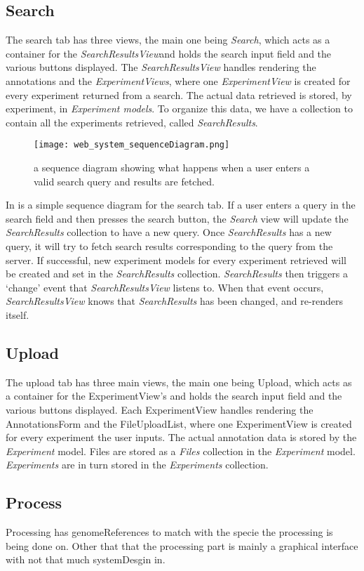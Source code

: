 \subsection{Search}
The search tab has three views, the main one being \textit{Search}, which acts as a container for the \textit{SearchResultsView}and holds the search input field and the various buttons displayed. The \textit{SearchResultsView} handles rendering the annotations and the \textit{ExperimentViews}, where one \textit{ExperimentView} is created for every experiment returned from a search. The actual data retrieved is stored, by experiment, in \textit{Experiment models}. To organize this data, we have a collection to contain all the experiments retrieved, called \textit{SearchResults}.
 
\begin{figure}[h]
\centering
\texttt{[image: web\_system\_sequenceDiagram.png]}
\caption{\label{fig:web_system_sequenceDiagram}a sequence diagram showing what happens when a user enters a valid search query and results are fetched.}
\end{figure}

In  is a simple sequence diagram for the search tab. If a user enters a query in the search field and then presses the search button, the \textit{Search} view will update the \textit{SearchResults} collection to have a new query. Once \textit{SearchResults} has a new query, it will try to fetch search results corresponding to the query from the server. If successful, new experiment models for every experiment retrieved will be created and set in the \textit{SearchResults} collection. \textit{SearchResults} then triggers a ‘change’ event that \textit{SearchResultsView} listens to. When that event occurs, \textit{SearchResultsView} knows that \textit{SearchResults} has been changed, and re-renders itself.


\subsection{Upload}
The upload tab has three main views, the main one being Upload, which acts as a container for the ExperimentView’s and holds the search input field and the various buttons displayed. Each ExperimentView handles rendering the AnnotationsForm and the FileUploadList, where one ExperimentView is created for every experiment the user inputs. The actual annotation data is stored by the \textit{Experiment} model. Files are stored as a \textit{Files} collection in the \textit{Experiment} model. \textit{Experiments} are in turn stored in the \textit{Experiments} collection.
\subsection{Process}
Processing has genomeReferences to match with the specie the processing is being done on. Other that that the processing part is mainly a graphical interface with not that much systemDesgin in.
